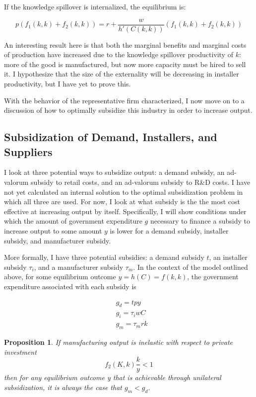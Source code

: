 \documentclass{article}
\newtheorem{proposition}{Proposition}
\begin{document}
If the knowledge spillover is internalized, the equilibrium is:

\begin{equation}
p ( f_1(k,k) + f_2(k,k)) = r + \frac{w}{h'(C(k,k))} ( f_1(k,k) + f_2 (k,k))
\end{equation}

An interesting result here is that both the marginal benefits and marginal costs of production have increased due to the knowledge spillover productivity of $k$: more of the good is manufactured, but now more capacity must be hired to sell it. I hypothesize that the size of the externality will be decreasing in installer productivity, but I have yet to prove this.

With the behavior of the representative firm characterized, I now move on to a discussion of how to optimally subsidize this industry in order to increase output.

\subsection{Subsidization of Demand, Installers, and Suppliers}

I look at three potential ways to subsidize output: a demand subsidy, an ad-valorum subsidy to retail costs, and an ad-valorum subsidy to R\&D costs. I have not yet calculated an internal solution to the optimal subsidization problem in which all three are used. For now, I look at what subsidy is the the most cost effective at increasing output by itself. Specifically, I will show conditions under which the amount of government expenditure $g$ necessary to finance a subsidy to increase output to some amount $y$ is lower for a demand subsidy, installer subsidy, and manufacturer subsidy.

More formally, I have three potential subsidies: a demand subsidy $t$, an installer subsidy $\tau_i$, and a manufacturer subsidy $\tau_m$. In the context of the model outlined above, for some equilibrium outcome $y = h(C) = f(k,k)$, the government expenditure associated with each subsidy is

\begin{align}
&g_d = tpy \\
&g_{i} = \tau_i w C \\
&g_{m} = \tau_m r k 
\end{align}

\begin{proposition}
If manufacturing output is inelastic with respect to private investment
\[
f_2(K,k) \frac{k}{y}  <  1
\]
then for any equilibrium outcome y that is achievable through unilateral subsidization, it is always the case that $g_m < g_d$.
\end{proposition}
\end{document}
